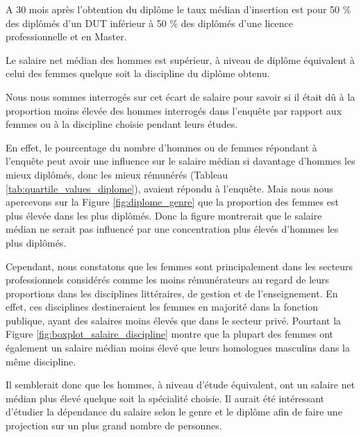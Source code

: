 \documentclass[12pt, a4paper, titlepage, table]{article}
\begin{document}
A 30 mois après l'obtention du diplôme le taux médian d'insertion est pour 50 \% des diplômés d'un DUT inférieur à 50 \% des diplômés d'une licence professionnelle et en Master.  

Le salaire net médian des hommes est supérieur, à niveau de diplôme équivalent à celui des femmes quelque soit la discipline du diplôme obtenu.

Nous nous sommes interrogés sur cet écart de salaire pour savoir si il était dû à la proportion moins élevée des hommes interrogés dans l'enquête par rapport aux femmes ou à la discipline choisie pendant leurs études.

En effet, le pourcentage du nombre d'hommes ou de femmes répondant à l'enquête peut avoir une influence sur le salaire médian si davantage d'hommes les mieux diplômés, donc les mieux rémunérés (Tableau \ref{tab:quartile_values_diplome}), avaient répondu à l'enquête. Mais nous nous apercevons sur la Figure \ref{fig:diplome_genre} que la proportion des femmes est plus élevée dans les plus diplômés. Donc la figure montrerait que le salaire médian ne serait pas influencé par une concentration plus élevés d'hommes les plus diplômés. 

Cependant, nous constatons que les femmes sont principalement dans les secteurs professionnels considérés comme les moins rémunérateurs au regard de leurs proportions dans les disciplines littéraires, de gestion et de l'enseignement. En effet, ces disciplines destineraient les femmes en majorité dans la fonction publique, ayant des salaires moins élevés que dans le secteur privé.
Pourtant la Figure \ref{fig:boxplot_salaire_discipline} montre que la plupart des femmes ont également un salaire médian moins élevé que leurs homologues masculins dans la même discipline.

Il semblerait donc que les hommes, à niveau d'étude équivalent, ont un salaire net médian plus élevé quelque soit la spécialité choisie.
Il aurait été intéressant d'étudier la dépendance du salaire selon le genre et le diplôme afin de faire une projection sur un plus grand nombre de personnes. 
\end{document}
